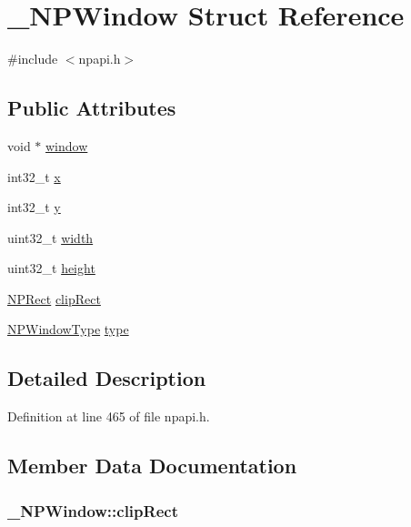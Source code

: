 \hypertarget{struct___n_p_window}{
\section{\_\-NPWindow Struct Reference}
\label{struct___n_p_window}
}


{\ttfamily \#include $<$npapi.h$>$}

\subsection*{Public Attributes}
\begin{DoxyCompactItemize}
\item 
void $\ast$ \hyperlink{struct___n_p_window_aba7452f14f927e3261ad97861838b494}{window}
\item 
int32\_\-t \hyperlink{struct___n_p_window_ad07051b09df8bba4340460148e2712d3}{x}
\item 
int32\_\-t \hyperlink{struct___n_p_window_ab5ab51089045b5a16323e36ea26a0c5a}{y}
\item 
uint32\_\-t \hyperlink{struct___n_p_window_a108a91a5fdc3e8130e0d40406612bd65}{width}
\item 
uint32\_\-t \hyperlink{struct___n_p_window_a971f3f5aecbf2d5b0796bb0b6c4339c1}{height}
\item 
\hyperlink{struct___n_p_rect}{NPRect} \hyperlink{struct___n_p_window_ab14c9414e8c203c36724868ef4a6fe4b}{clipRect}
\item 
\hyperlink{npapi_8h_a92d3d7179cbf46985d550adc3274a5da}{NPWindowType} \hyperlink{struct___n_p_window_a56b609c5f878624bae8fa3840cff0ea4}{type}
\end{DoxyCompactItemize}


\subsection{Detailed Description}


Definition at line 465 of file npapi.h.



\subsection{Member Data Documentation}
\hypertarget{struct___n_p_window_ab14c9414e8c203c36724868ef4a6fe4b}{
\subsubsection[{clipRect}]{ {\bf \_\-NPWindow::clipRect}}}
\label{struct___n_p_window_ab14c9414e8c203c36724868ef4a6fe4b}


